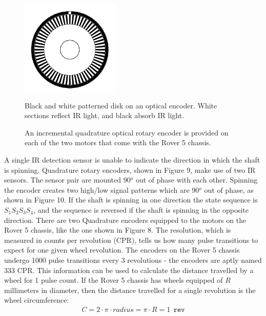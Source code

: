 \documentclass[a4paper]{article}
\begin{document}
\begin{figure}[h]
\centering
\begin{minipage}[t]{0.45\textwidth}
\centering
\includegraphics[height=4.5cm]{optical_enc}
\caption{Black and white patterned disk on an optical encoder. White sections reflect IR light, and black absorb IR light.}
\end{minipage}
\hspace{1cm}
\begin{minipage}[t]{0.45\textwidth}
\centering
{}
\caption{An incremental quadrature optical rotary encoder is provided on each of the two motors that come with the Rover 5 chassis.}
\end{minipage}
\end{figure}

A single IR detection sensor is unable to indicate the direction in which the shaft is spinning. Quadrature rotary encoders, shown in Figure 9, make use of two IR sensors. The sensor pair are mounted 90$^o$ out of phase with each other. Spinning the encoder creates two high/low signal patterns which are 90$^o$ out of phase, as shown in Figure 10. If the shaft is spinning in one direction the state sequence is $S_1 S_2 S_3 S_4$, and the sequence is reversed if the shaft is spinning in the opposite direction. There are two Quadrature encoders equipped to the motors on the Rover 5 chassis, like the one shown in Figure 8. The resolution, which is measured in counts per revolution (CPR), tells us how many pulse transitions to expect for one given wheel revolution. The encoders on the Rover 5 chassis undergo 1000 pulse transitions every 3 revolutions - the encoders are aptly named 333 CPR. This information can be used to calculate the distance travelled by a wheel for 1 pulse count. If the Rover 5 chassis has wheels equipped of $R$ millimeters in diameter, then the distance travelled for a single revolution is the wheel circumference:
\begin{align*}
C 	= 2 \cdot \pi \cdot radius = \pi \cdot R = 1 \ \ \texttt{rev}
\end{align*}
\end{document}
